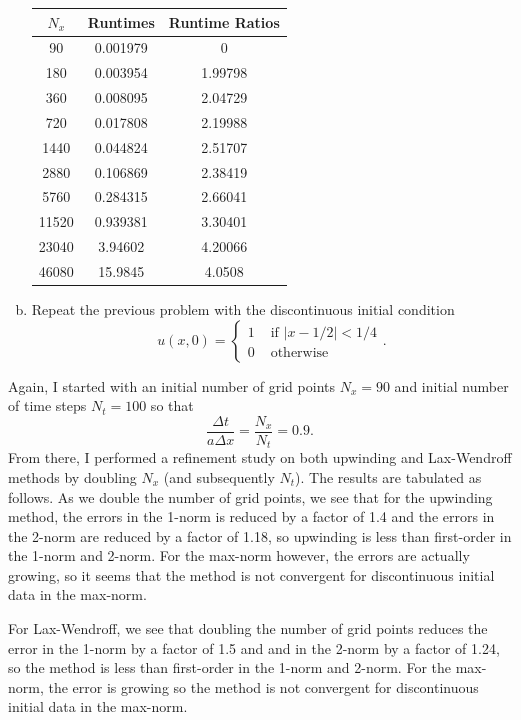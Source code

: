 \documentclass[12pt]{article}
\begin{document}
\begin{enumerate}[(a)]
\begin{minipage}{0.5\textwidth}
\begin{table}[H]
\begin{tabular}{||c|cc||}
\hline \hline
    $N_x$ &   Runtimes &   Runtime Ratios \\
\hline
    90 &   0.001979 &          0       \\
   180 &   0.003954 &          1.99798 \\
   360 &   0.008095 &          2.04729 \\
   720 &   0.017808 &          2.19988 \\
  1440 &   0.044824 &          2.51707 \\
  2880 &   0.106869 &          2.38419 \\
  5760 &   0.284315 &          2.66041 \\
 11520 &   0.939381 &          3.30401 \\
 23040 &   3.94602  &          4.20066 \\
 46080 &  15.9845   &          4.0508  \\
\hline\hline
\end{tabular}
\end{table}
\end{minipage}

\item Repeat the previous problem with the discontinuous initial condition
$$u(x,0) = \begin{cases}1 & \text{ if } |x-1/2|<1/4 \\ 0 & \text{ otherwise } \end{cases}.$$
\end{enumerate}

Again, I started with an initial number of grid points $N_x = 90$ and initial number of time steps $N_t = 100$ so that $$\dfrac{\Delta t}{a\Delta x} = \dfrac{N_x}{N_t} = 0.9.$$
From there, I performed a refinement study on both upwinding and Lax-Wendroff methods by doubling $N_x$ (and subsequently $N_t$).  The results are tabulated as follows. As we double the number of grid points, we see that for the upwinding method, the errors in the 1-norm is reduced by a factor of 1.4 and the errors in the 2-norm are reduced by a factor of 1.18, so upwinding is less than first-order in the 1-norm and 2-norm.  For the max-norm however, the errors are actually growing, so it seems that the method is not convergent for discontinuous initial data in the max-norm.

For Lax-Wendroff, we see that doubling the number of grid points reduces the error in the 1-norm by a factor of 1.5 and and in the 2-norm by a factor of 1.24, so the method is less than first-order in the 1-norm and 2-norm.  For the max-norm, the error is growing so the method is not convergent for discontinuous initial data in the max-norm.
\end{document}
